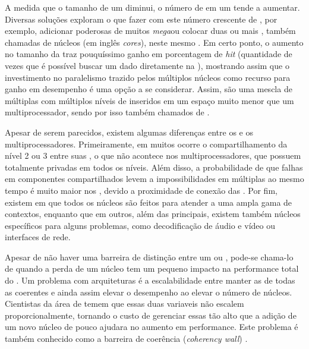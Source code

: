 A medida que o tamanho de um \transistor diminui, o número de \transistors em um \chip tende a aumentar. Diversas soluções exploram o que fazer com este número crescente de \transistors, por exemplo, adicionar \caches poderosas de muitos \textit{mega}\bytes ou colocar duas ou mais \CPUs, também chamadas de núcleos (em inglês \textit{cores}), neste mesmo \chip. Em certo ponto, o aumento no tamanho da \cache traz pouquíssimo ganho em porcentagem de \textit{hit} (quantidade de vezes que é possível buscar um dado diretamente na \cache), mostrando assim que o investimento no paralelismo trazido pelos múltiplos núcleos como recurso para ganho em desempenho é uma opção a se considerar. Assim, \chips \multicore são uma mescla de múltiplas \CPUs com múltiplos níveis de \cache inseridos em um espaço muito menor que um multiprocessador, sendo por isso também chamados de \textit{\CMPs}.

Apesar de serem parecidos, existem algumas diferenças entre os \CMPs e os multiprocessadores. Primeiramente, em muitos \CMPs ocorre o compartilhamento da \cache nível 2 ou 3 entre suas \CPUs, o que não acontece nos multiprocessadores, que possuem \caches totalmente privadas em todos os níveis. Além disso, a probabilidade de que falhas em componentes compartilhados levem a impossibilidades em múltiplas \CPUs ao mesmo tempo é muito maior nos \CMPs, devido a proximidade de conexão das \CPUs. Por fim, existem \chips \multicore em que todos os núcleos são feitos para atender a uma ampla gama de contextos, enquanto que em outros, além das \CPUs principais, existem também núcleos específicos para alguns problemas, como decodificação de áudio e vídeo ou interfaces de rede. 

Apesar de não haver uma barreira de distinção entre um \chip \manycore ou \multicore, pode-se chama-lo de \manycore quando a perda de um núcleo tem um pequeno impacto na performance total do \chip. Um problema com arquiteturas \manycore é a escalabilidade entre manter as \caches de todas as \CPUs coerentes e ainda assim elevar o desempenho ao elevar o número de núcleos. Cientistas da área de \HPC temem que essas duas variaveis não escalem proporcionalmente, tornando o custo de gerenciar essas \caches tão alto que a adição de um novo núcleo de pouco ajudara no aumento em performance. Este problema é também conhecido como a barreira de coerência  (\textit{coherency wall}) \cite{TanenbaumMordenOS}.

